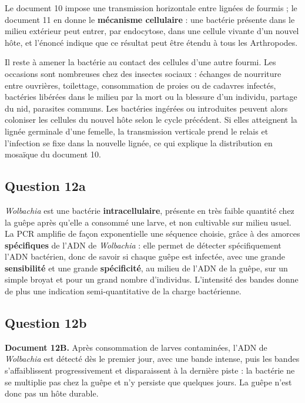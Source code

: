 \documentclass[11pt,a4paper]{article}
\begin{document}
Le document 10 impose une transmission horizontale entre lignées de fourmis ; le document 11 en donne le \textbf{mécanisme cellulaire} : une bactérie présente dans le milieu extérieur peut entrer, par endocytose, dans une cellule vivante d'un nouvel hôte, et l'énoncé indique que ce résultat peut être étendu à tous les Arthropodes.

Il reste à amener la bactérie au contact des cellules d'une autre fourmi. Les occasions sont nombreuses chez des insectes sociaux : échanges de nourriture entre ouvrières, toilettage, consommation de proies ou de cadavres infectés, bactéries libérées dans le milieu par la mort ou la blessure d'un individu, partage du nid, parasites communs. Les bactéries ingérées ou introduites peuvent alors coloniser les cellules du nouvel hôte selon le cycle précédent. Si elles atteignent la lignée germinale d'une femelle, la transmission verticale prend le relais et l'infection se fixe dans la nouvelle lignée, ce qui explique la distribution en mosaïque du document 10.

\hypertarget{question-12a}{%
\subsection{Question 12a}\label{question-12a}}

\emph{Wolbachia} est une bactérie \textbf{intracellulaire}, présente en très faible quantité chez la guêpe après qu'elle a consommé une larve, et non cultivable sur milieu usuel. La PCR amplifie de façon exponentielle une séquence choisie, grâce à des amorces \textbf{spécifiques} de l'ADN de \emph{Wolbachia} : elle permet de détecter spécifiquement l'ADN bactérien, donc de savoir si chaque guêpe est infectée, avec une grande \textbf{sensibilité} et une grande \textbf{spécificité}, au milieu de l'ADN de la guêpe, sur un simple broyat et pour un grand nombre d'individus. L'intensité des bandes donne de plus une indication semi-quantitative de la charge bactérienne.

\hypertarget{question-12b}{%
\subsection{Question 12b}\label{question-12b}}

\textbf{Document 12B.} Après consommation de larves contaminées, l'ADN de \emph{Wolbachia} est détecté dès le premier jour, avec une bande intense, puis les bandes s'affaiblissent progressivement et disparaissent à la dernière piste : la bactérie ne se multiplie pas chez la guêpe et n'y persiste que quelques jours. La guêpe n'est donc pas un hôte durable.
\end{document}
